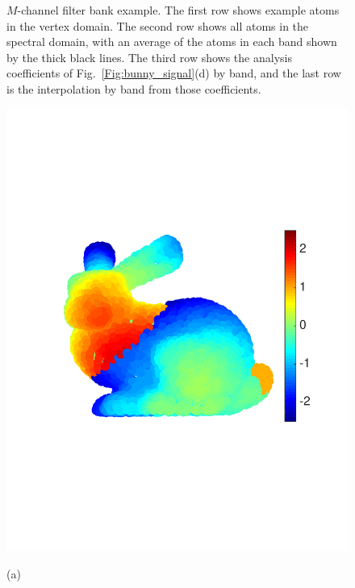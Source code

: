 \documentclass{article}
\begin{document}
\begin{figure}[bth]
\begin{minipage}[m]{0.16\linewidth}
\end{minipage}
\caption{$M$-channel filter bank example. The first row shows example atoms in the vertex domain. The second row shows all atoms in the spectral domain, with an average of the atoms in each band shown by the thick black lines. The third row shows the analysis coefficients of Fig.\ \ref{Fig:bunny_signal}(d) by band, and the last row is the interpolation by band from those coefficients.}\label{Fig:bunny_coef}
\end{figure}

\begin{figure}[tbh]
\begin{minipage}[m]{0.48\linewidth}
\centerline{\includegraphics[width=.8\linewidth]{fig_bunny_signal}}
\centerline{\small{(a)}}
\end{minipage}
\begin{minipage}[m]{0.48\linewidth}

\end{minipage}
\end{figure}
\end{document}

